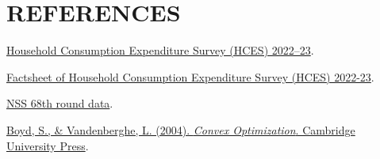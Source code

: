 \documentclass[12pt]{article}
\begin{document}
\section{REFERENCES}
\begin{thebibliography}{9}
    \href{https://www.mospi.gov.in/publication/factsheet-household-consumption-expendit}{Household Consumption Expenditure Survey (HCES) 2022–23}.
    
    \href{https://www.mospi.gov.in/publication/factsheet-household-consumption-expenditure-survey-hces2022-23}{Factsheet of Household Consumption Expenditure Survey (HCES) 2022-23}.
    
    \href{https://mospi.gov.in/sites/default/files/publication_reports/nss_rep_563_13mar15.pdf}{NSS 68th round data}.
    
    \href{https://web.stanford.edu/~boyd/cvxbook/bv_cvxbook.pdf}{Boyd, S., \& Vandenberghe, L. (2004). \textit{Convex Optimization}. Cambridge University Press}.
\end{thebibliography}
\end{document}
